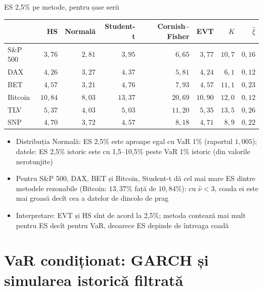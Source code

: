 \begin{frame}{ES 2,5\% pe metode, pentru șase serii}
\itemsize{\footnotesize}
\begin{center}
\footnotesize
\begin{tabular}{lrrrrrrr}
\toprule
& HS & Normală & Student-t & Cornish--Fisher & EVT & $K$ & $\hat\xi$ \\
\midrule
S\&P 500 & $3{,}76$ & $2{,}81$ & $3{,}95$ & $6{,}65$ & $3{,}77$ & ${10{,}7}$ & $0{,}16$ \\
DAX & $4{,}26$ & $3{,}27$ & $4{,}37$ & $5{,}81$ & $4{,}24$ & ${6{,}1}$ & $0{,}12$ \\
BET & $4{,}57$ & $3{,}21$ & $4{,}76$ & $7{,}93$ & $4{,}57$ & ${11{,}1}$ & $0{,}23$ \\
Bitcoin & $10{,}84$ & $8{,}03$ & $13{,}37$ & $20{,}69$ & $10{,}90$ & ${12{,}0}$ & $0{,}12$ \\
TLV & $5{,}37$ & $4{,}03$ & $5{,}03$ & $11{,}20$ & $5{,}35$ & ${13{,}5}$ & $0{,}26$ \\
SNP & $4{,}70$ & $3{,}72$ & $4{,}57$ & $8{,}18$ & $4{,}71$ & ${8{,}9}$ & $0{,}22$ \\
\bottomrule
\end{tabular}
\end{center}
\begin{itemize}
    \item Distribuția Normală: ES 2,5\% este aproape egal cu VaR 1\% (raportul $1{,}005$); datele: ES 2,5\% istoric este cu 1{,}5--10{,}5\% peste VaR 1\% istoric (din valorile nerotunjite)
    \item Pentru S\&P 500, DAX, BET și Bitcoin, Student-t dă cel mai mare ES dintre metodele rezonabile (Bitcoin: $13{,}37\%$ față de $10{,}84\%$): cu $\hat\nu < 3$, coada ei este mai groasă decît cea a datelor de dincolo de prag
    \item Interpretare: EVT și HS sînt de acord la 2,5\%; metoda contează mai mult pentru ES decît pentru VaR, deoarece ES depinde de întreaga coadă
\end{itemize}
\end{frame}


\section{VaR condiționat: GARCH și simularea istorică filtrată}


